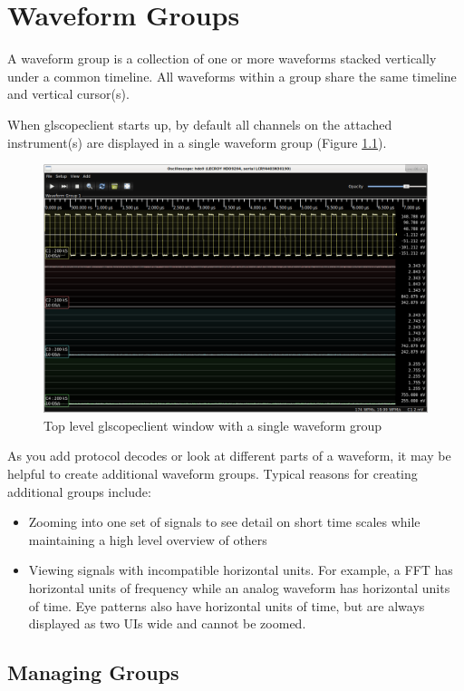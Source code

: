 \chapter{Waveform Groups}

A waveform group is a collection of one or more waveforms stacked vertically under a common timeline. All waveforms
within a group share the same timeline and vertical cursor(s).

When glscopeclient starts up, by default all channels on the attached instrument(s) are displayed in a single waveform
group (Figure \ref{single-group}).

\begin{figure}[h]
\centering
\includegraphics[width=13cm]{images/overview.png}
\caption{Top level glscopeclient window with a single waveform group}
\label{single-group}
\end{figure}

As you add protocol decodes or look at different parts of a waveform, it may be helpful to create additional waveform
groups. Typical reasons for creating additional groups include:

\begin{itemize}
\item Zooming into one set of signals to see detail on short time scales while maintaining a high level overview of
others
\item Viewing signals with incompatible horizontal units. For example, a FFT has horizontal units of frequency while an
analog waveform has horizontal units of time. Eye patterns also have horizontal units of time, but are always displayed
as two UIs wide and cannot be zoomed.
\end{itemize}

\section{Managing Groups}

